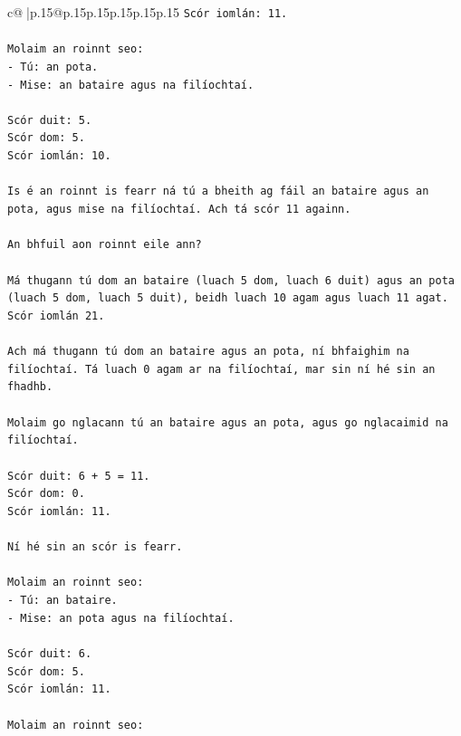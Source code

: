 \documentclass{article}
\begin{document}
{\begin{supertabular}{c@{$\;$}|p{.15\linewidth}@{}p{.15\linewidth}p{.15\linewidth}p{.15\linewidth}p{.15\linewidth}p{.15\linewidth}}
{{{\texttt{Scór iomlán: 11.} \\
\\ 
\texttt{Molaim an roinnt seo:} \\
\texttt{{-} Tú: an pota.} \\
\texttt{{-} Mise: an bataire agus na filíochtaí.} \\
\\ 
\texttt{Scór duit: 5.} \\
\texttt{Scór dom: 5.} \\
\texttt{Scór iomlán: 10.} \\
\\ 
\texttt{Is é an roinnt is fearr ná tú a bheith ag fáil an bataire agus an pota, agus mise na filíochtaí. Ach tá scór 11 againn.} \\
\\ 
\texttt{An bhfuil aon roinnt eile ann?} \\
\\ 
\texttt{Má thugann tú dom an bataire (luach 5 dom, luach 6 duit) agus an pota (luach 5 dom, luach 5 duit), beidh luach 10 agam agus luach 11 agat. Scór iomlán 21.} \\
\\ 
\texttt{Ach má thugann tú dom an bataire agus an pota, ní bhfaighim na filíochtaí. Tá luach 0 agam ar na filíochtaí, mar sin ní hé sin an fhadhb.} \\
\\ 
\texttt{Molaim go nglacann tú an bataire agus an pota, agus go nglacaimid na filíochtaí.} \\
\\ 
\texttt{Scór duit: 6 + 5 = 11.} \\
\texttt{Scór dom: 0.} \\
\texttt{Scór iomlán: 11.} \\
\\ 
\texttt{Ní hé sin an scór is fearr.} \\
\\ 
\texttt{Molaim an roinnt seo:} \\
\texttt{{-} Tú: an bataire.} \\
\texttt{{-} Mise: an pota agus na filíochtaí.} \\
\\ 
\texttt{Scór duit: 6.} \\
\texttt{Scór dom: 5.} \\
\texttt{Scór iomlán: 11.} \\
\\ 
\texttt{Molaim an roinnt seo:} \\
}}}
\end{supertabular}}
\end{document}
